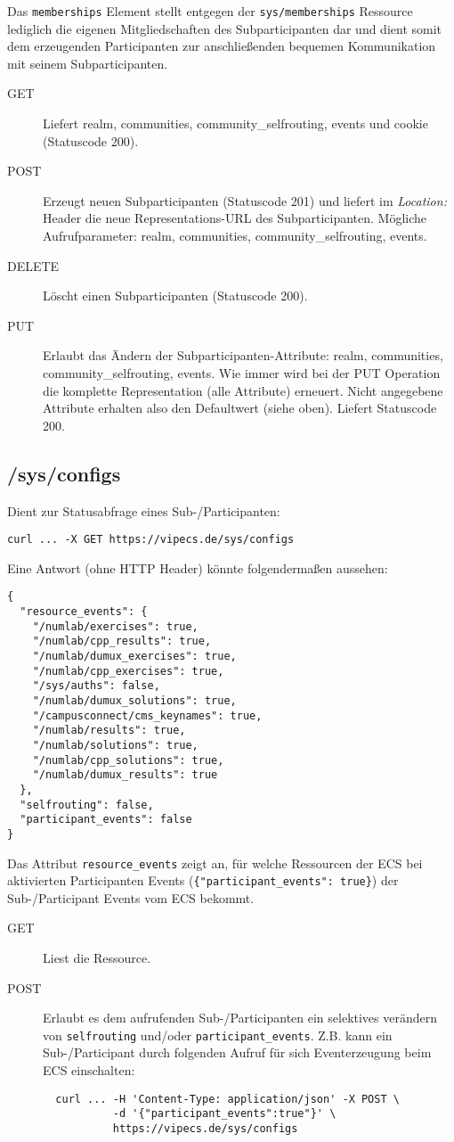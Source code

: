 \documentclass[dvips,12pt,a4paper]{article}
\begin{document}
Das \texttt{memberships} Element stellt entgegen der \texttt{sys/memberships}
Ressource lediglich die eigenen Mitgliedschaften des Subparticipanten dar und
dient somit dem erzeugenden Participanten zur anschließenden bequemen
Kommunikation mit seinem Subparticipanten.

\begin{description}
  \item[GET] Liefert realm, communities, community\_selfrouting, events und cookie (Statuscode 200).
  \item[POST] Erzeugt neuen Subparticipanten (Statuscode 201) und liefert im \textit{Location:} Header die neue Representations-URL des Subparticipanten. Mögliche Aufrufparameter: realm, communities, community\_selfrouting, events.
  \item[DELETE] Löscht einen Subparticipanten (Statuscode 200).
  \item[PUT] Erlaubt das Ändern der Subparticipanten-Attribute: realm, communities, community\_selfrouting, events. Wie immer wird bei der PUT Operation die komplette Representation (alle Attribute) erneuert. Nicht angegebene Attribute erhalten also den Defaultwert (siehe oben). Liefert Statuscode 200.
\end{description}

\subsection{/sys/configs}
Dient zur Statusabfrage eines Sub-/Participanten:
\begin{verbatim}
curl ... -X GET https://vipecs.de/sys/configs
\end{verbatim}
Eine Antwort (ohne HTTP Header) könnte folgendermaßen aussehen:
\begin{verbatim}
{
  "resource_events": {
    "/numlab/exercises": true,
    "/numlab/cpp_results": true,
    "/numlab/dumux_exercises": true,
    "/numlab/cpp_exercises": true,
    "/sys/auths": false,
    "/numlab/dumux_solutions": true,
    "/campusconnect/cms_keynames": true,
    "/numlab/results": true,
    "/numlab/solutions": true,
    "/numlab/cpp_solutions": true,
    "/numlab/dumux_results": true
  },
  "selfrouting": false,
  "participant_events": false
}
\end{verbatim}
Das Attribut \texttt{resource\_events} zeigt an, für welche Ressourcen der ECS
bei aktivierten Participanten Events (\verb#{"participant_events": true}#)
der Sub-/Participant Events vom ECS bekommt.
\begin{description}
  \item[GET] Liest die Ressource.
  \item[POST] Erlaubt es dem aufrufenden Sub-/Participanten  ein selektives
  verändern von \texttt{selfrouting} und/oder \texttt{participant\_events}.
  Z.B. kann ein Sub-/Participant durch folgenden Aufruf für sich Eventerzeugung
  beim ECS einschalten:
  \begin{verbatim}
  curl ... -H 'Content-Type: application/json' -X POST \
           -d '{"participant_events":true"}' \
           https://vipecs.de/sys/configs
  \end{verbatim}
\end{description}
\end{document}
